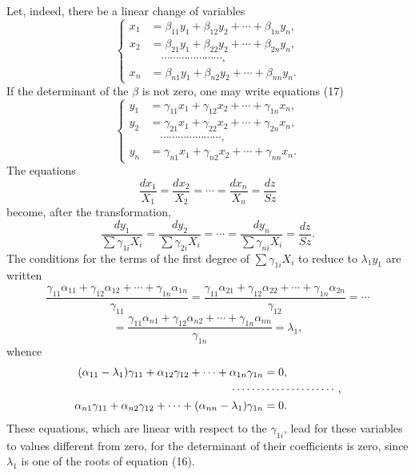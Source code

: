 \documentclass[11pt]{article}
\begin{document}
Let, indeed, there be a linear change of variables
\begin{equation*}\tag{17}
\left\{
\begin{aligned}
x_1&=\beta_{11}y_1+\beta_{12}y_2+\cdots+\beta_{1n}y_n,\\
x_2&=\beta_{21}y_1+\beta_{22}y_2+\cdots+\beta_{2n}y_n,\\
&\hspace{1em}\cdots\cdots\cdots\cdots\cdots\cdots\cdots,\\
x_n&=\beta_{n1}y_1+\beta_{n2}y_2+\cdots+\beta_{nn}y_n.
\end{aligned}
\right.
\end{equation*}
If the determinant of the $\beta$ is not zero, one may write equations (17)
\begin{equation*}\tag{18}
\left\{
\begin{aligned}
y_1&=\gamma_{11}x_1+\gamma_{12}x_2+\cdots+\gamma_{1n}x_n,\\
y_2&=\gamma_{21}x_1+\gamma_{22}x_2+\cdots+\gamma_{2n}x_n,\\
&\hspace{1em}\cdots\cdots\cdots\cdots\cdots\cdots\cdots,\\
y_n&=\gamma_{n1}x_1+\gamma_{n2}x_2+\cdots+\gamma_{nn}x_n.
\end{aligned}
\right.
\end{equation*}
The equations
\[
\frac{dx_1}{X_1}=\frac{dx_2}{X_2}=\cdots=\frac{dx_n}{X_n}=\frac{dz}{Sz}
\]
become, after the transformation,
\begin{equation*}\tag{19}
\frac{dy_1}{\sum \gamma_{1i}X_i}
=\frac{dy_2}{\sum \gamma_{2i}X_i}
=\cdots=
\frac{dy_n}{\sum \gamma_{ni}X_i}
=\frac{dz}{Sz}.
\end{equation*}
The conditions for the terms of the first degree of $\sum\gamma_{1i}X_i$ to reduce to $\lambda_1y_1$ are written
\[
\frac{\gamma_{11}\alpha_{11}+\gamma_{12}\alpha_{12}+\cdots+\gamma_{1n}\alpha_{1n}}{\gamma_{11}}
=
\frac{\gamma_{11}\alpha_{21}+\gamma_{12}\alpha_{22}+\cdots+\gamma_{1n}\alpha_{2n}}{\gamma_{12}}
=\cdots
\]
\[
=\frac{\gamma_{11}\alpha_{n1}+\gamma_{12}\alpha_{n2}+\cdots+\gamma_{1n}\alpha_{nn}}{\gamma_{1n}}
=\lambda_1,
\]
whence
\[
\begin{aligned}
(\alpha_{11}-\lambda_1)\gamma_{11}+\alpha_{12}\gamma_{12}+\cdots+\alpha_{1n}\gamma_{1n}&=0,\\
&\hspace{-3em}\cdots\cdots\cdots\cdots\cdots\cdots\cdots,\\
\alpha_{n1}\gamma_{11}+\alpha_{n2}\gamma_{12}+\cdots+(\alpha_{nn}-\lambda_1)\gamma_{1n}&=0.
\end{aligned}
\]
These equations, which are linear with respect to the $\gamma_{1i}$, lead for these variables to values different from zero, for the determinant of their coefficients is zero, since $\lambda_1$ is one of the roots of equation (16).
\end{document}
